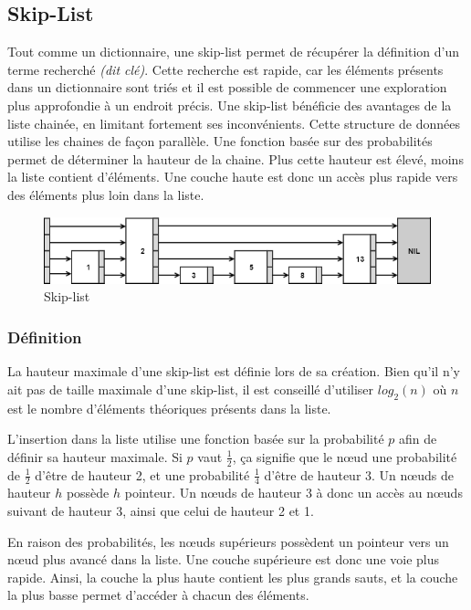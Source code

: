 \documentclass[hidelinks,a4paper, 12pt]{article}
\begin{document}
	\newpage
	\subsection{Skip-List}
	Tout comme un dictionnaire, une skip-list permet de récupérer la définition d'un terme recherché \textit{(dit clé)}. Cette recherche est rapide, car les éléments présents dans un dictionnaire sont triés et il est possible de commencer une exploration plus approfondie à un endroit précis.
	 Une skip-list bénéficie des avantages de la liste chainée, en limitant fortement ses inconvénients. Cette structure de données utilise les chaines de façon parallèle. Une fonction basée sur des probabilités permet de déterminer la hauteur de la chaine. Plus cette hauteur est élevé, moins la liste contient d'éléments. Une couche haute est donc un accès plus rapide vers des éléments plus loin dans la liste.
	 
	 \begin{figure}[h]
	 	\includegraphics[width=\textwidth]{img/skip}
	 	\caption{Skip-list}
	 	\label{skip}
	 \end{figure}
	 
	\subsubsection*{Définition}
	La hauteur maximale d'une skip-list est définie lors de sa création. Bien qu'il n'y ait pas de taille maximale d'une skip-list, il est conseillé d'utiliser $log_2(n)$ où $n$ est le nombre d'éléments théoriques présents dans la liste.
	
	L'insertion dans la liste utilise une fonction basée sur la probabilité $p$ afin de définir sa hauteur maximale. Si $p$ vaut $\frac{1}{2}$, ça signifie que le nœud une probabilité de $\frac{1}{2}$ d'être de hauteur 2, et une probabilité $\frac{1}{4}$ d'être de hauteur 3. Un nœuds de hauteur $h$ possède $h$ pointeur. Un nœuds de hauteur 3 à donc un accès au nœuds suivant de hauteur 3, ainsi que celui de hauteur 2 et 1.
	
	En raison des probabilités, les nœuds supérieurs possèdent un pointeur vers un nœud plus avancé dans la liste. Une couche supérieure est donc une voie plus rapide. Ainsi, la couche la plus haute contient les plus grands sauts, et la couche la plus basse permet d'accéder à chacun des éléments.
		
\end{document}
